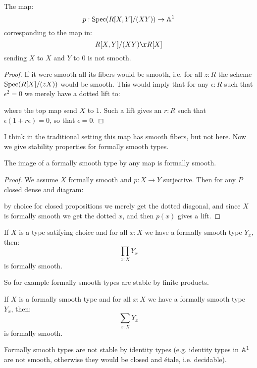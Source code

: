 \begin{lemma}
The map:
\[
p:\operatorname{Spec}(R[X,Y]/(XY))\to \mathbb{A}^1
\] 
corresponding to the map in:
\[
R[X,Y]/(XY) \r R[X]
\]
sending $X$ to $X$ and $Y$ to $0$ is not smooth.
\end{lemma}

\begin{proof}
If it were smooth all its fibers would be smooth, i.e. for all $z:R$ the scheme $\operatorname{Spec}(R[X]/(zX))$ would be smooth. This would imply that for any $\epsilon:R$ such that $\epsilon^2=0$ we merely have a dotted lift to:
 \begin{center}
    \end{center} 
    where the top map send $X$ to $1$. Such a lift gives an $r:R$ such that $\epsilon(1+r\epsilon)=0$, so that $\epsilon=0$.
\end{proof}

I think in the traditional setting this map has smooth fibers, but not here. Now we give stability properties for formally smooth types.

\begin{proposition}
The image of a formally smooth type by any map is formally smooth.
\end{proposition}
\begin{proof}
We assume $X$ formally smooth and $p:X\to Y$ surjective. Then for any $P$ closed dense and diagram:
 \begin{center}
    \end{center} 
    by choice for closed propositions we merely get the dotted diagonal, and since $X$ is formally smooth we get the dotted $x$, and then $p(x)$ gives a lift.
\end{proof}

\begin{lemma}
If $X$ is a type satifying choice and for all $x:X$ we have a formally smooth type $Y_x$, then:
\[\prod_{x:X}Y_x\]
is formally smooth.
\end{lemma}

So for example formally smooth types are stable by finite products. 

\begin{lemma}
If $X$ is a formally smooth type and for all $x:X$ we have a formally smooth type $Y_x$, then:
\[\sum_{x:X}Y_x\]
is formally smooth.
\end{lemma}

Formally smooth types are not stable by identity types (e.g. identity types in $\mathbb{A}^1$ are not smooth, otherwise they would be closed and étale, i.e. decidable).


